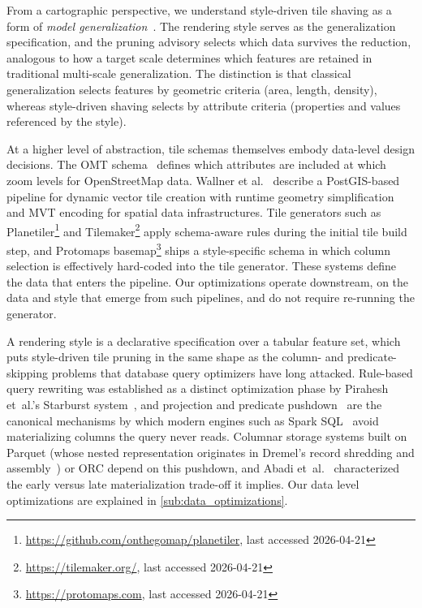 From a cartographic perspective, we understand style-driven tile shaving as a form of \emph{model generalization}~\cite{mcmasterGeneralizationDigitalCartography1992}.
The rendering style serves as the generalization specification, and the pruning advisory selects which data survives the reduction, analogous to how a target scale determines which features are retained in traditional multi-scale generalization.
The distinction is that classical generalization selects features by geometric criteria (area, length, density), whereas style-driven shaving selects by attribute criteria (properties and values referenced by the style).

At a higher level of abstraction, tile schemas themselves embody data-level design decisions.
The \ac{OMT} schema~\cite{maronVectorTilesAre2025} defines which attributes are included at which zoom levels for OpenStreetMap data.
Wallner et al.~\cite{wallnerOpenSourceVector2022} describe a PostGIS-based pipeline for dynamic vector tile creation with runtime geometry simplification and \ac{MVT} encoding for spatial data infrastructures.
Tile generators such as Planetiler\footnote{\url{https://github.com/onthegomap/planetiler}, last accessed 2026-04-21} and Tilemaker\footnote{\url{https://tilemaker.org/}, last accessed 2026-04-21} apply schema-aware rules during the initial tile build step, and Protomaps basemap\footnote{\url{https://protomaps.com}, last accessed 2026-04-21} ships a style-specific schema in which column selection is effectively hard-coded into the tile generator.
These systems define the data that enters the pipeline.
Our optimizations operate downstream, on the data and style that emerge from such pipelines, and do not require re-running the generator.

A rendering style is a declarative specification over a tabular feature set, which puts style-driven tile pruning in the same shape as the column- and predicate-skipping problems that database query optimizers have long attacked.
Rule-based query rewriting was established as a distinct optimization phase by Pirahesh et~al.'s Starburst system~\cite{piraheshExtensibleRuleBased1992}, and projection and predicate pushdown~\cite{graefeQueryEvaluationTechniques1993} are the canonical mechanisms by which modern engines such as Spark SQL~\cite{armbrustSparkSQLRelational2015} avoid materializing columns the query never reads.
Columnar storage systems built on Parquet (whose nested representation originates in Dremel's record shredding and assembly~\cite{melnikDremelInteractiveAnalysis2010}) or ORC depend on this pushdown, and Abadi et~al.~\cite{abadiMaterializationStrategiesColumnOriented2007} characterized the early versus late materialization trade-off it implies.
Our data level optimizations are explained in \cref{sub:data_optimizations}.

